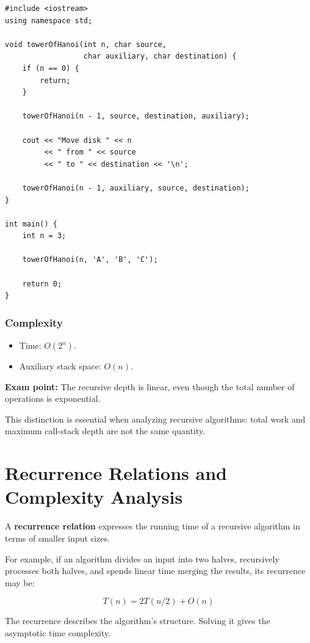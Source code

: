 \begin{lstlisting}[style=cppstyle]
#include <iostream>
using namespace std;

void towerOfHanoi(int n, char source,
                  char auxiliary, char destination) {
    if (n == 0) {
        return;
    }

    towerOfHanoi(n - 1, source, destination, auxiliary);

    cout << "Move disk " << n
         << " from " << source
         << " to " << destination << '\n';

    towerOfHanoi(n - 1, auxiliary, source, destination);
}

int main() {
    int n = 3;

    towerOfHanoi(n, 'A', 'B', 'C');

    return 0;
}
\end{lstlisting}

\subsubsection{Complexity}

\begin{itemize}
    \item Time: $O(2^n)$.
    \item Auxiliary stack space: $O(n)$.
\end{itemize}

\textbf{Exam point:} The recursive depth is linear, even though the total number of operations is exponential.

This distinction is essential when analyzing recursive algorithms: total work and maximum call-stack depth are not the same quantity.

\section{Recurrence Relations and Complexity Analysis}

A \textbf{recurrence relation} expresses the running time of a recursive algorithm in terms of smaller input sizes.

For example, if an algorithm divides an input into two halves, recursively processes both halves, and spends linear time merging the results, its recurrence may be:


\[
\boxed{T(n)=2T(n/2)+O(n)}
\]


The recurrence describes the algorithm's structure. Solving it gives the asymptotic time complexity.

